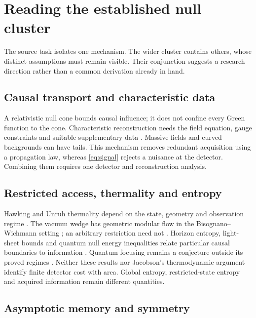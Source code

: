 \documentclass[12pt,a4paper]{article}
\theoremstyle{definition}
\begin{document}
\section{Reading the established null cluster}
\label{sec:cluster}

The source task isolates one mechanism. The wider cluster contains others,
whose distinct assumptions must remain visible. Their conjunction suggests
a research direction rather than a common derivation already in hand.

\subsection{Causal transport and characteristic data}

A relativistic null cone bounds causal influence; it does not confine
every Green function to the cone. Characteristic reconstruction needs
the field equation, gauge constraints and suitable supplementary data
\cite{Wald1984}. Massive fields and curved backgrounds can have tails.
This mechanism removes redundant acquisition using a propagation law,
whereas \eqref{eq:signal} rejects a nuisance at the detector. Combining
them requires one detector and reconstruction analysis.

\subsection{Restricted access, thermality and entropy}

Hawking and Unruh thermality depend on the state, geometry and observation
regime \cite{Hawking1975,Unruh1976}. The vacuum wedge has geometric modular
flow in the Bisognano--Wichmann setting \cite{BisognanoWichmann1975,BisognanoWichmann1976};
an arbitrary restriction need not \cite{Haag1996}. Horizon entropy,
light-sheet bounds and quantum null energy inequalities relate particular
causal boundaries to information \cite{Bekenstein1973,Bousso1999,QNEC2016}.
Quantum focusing remains a conjecture outside its proved regimes
\cite{QFC2016}. Neither these results nor Jacobson's thermodynamic argument
\cite{Jacobson1995} identify finite detector cost with area. Global
entropy, restricted-state entropy and acquired information remain
different quantities.

\subsection{Asymptotic memory and symmetry}
\end{document}
